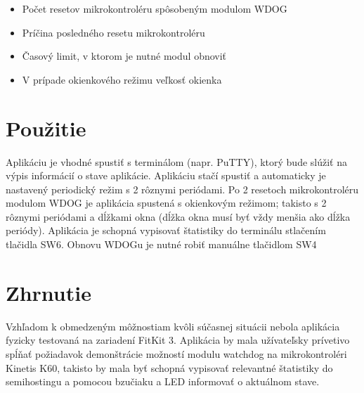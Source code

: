 \documentclass[12pt,a4paper,titlepage,final]{article}
\begin{document}
\begin{itemize}
    \item Počet resetov mikrokontroléru spôsobeným modulom WDOG
    \item Príčina posledného resetu mikrokontroléru
    \item Časový limit, v ktorom je nutné modul obnoviť
    \item V prípade okienkového režimu veľkosť okienka
\end{itemize}


\section{Použitie}
Aplikáciu je vhodné spustiť s terminálom (napr. PuTTY), ktorý bude slúžiť na výpis informácií o stave aplikácie. Aplikáciu stačí spustiť a automaticky je nastavený periodický režim s 2 rôznymi periódami. Po 2 resetoch mikrokontroléru modulom WDOG je aplikácia spustená s okienkovým režimom; takisto s 2 rôznymi periódami a dĺžkami okna (dĺžka okna musí byť vždy menšia ako dĺžka periódy). Aplikácia je schopná vypisovať štatistiky do terminálu stlačením tlačidla SW6. Obnovu WDOGu je nutné robiť manuálne tlačidlom SW4


\section{Zhrnutie}
Vzhľadom k obmedzeným môžnostiam kvôli súčasnej situácii nebola aplikácia fyzicky testovaná na zariadení FitKit 3. Aplikácia by mala užívateľsky prívetivo spĺňať požiadavok demonštrácie možností modulu watchdog na mikrokontroléri Kinetis K60, takisto by mala byť schopná vypisovať relevantné štatistiky do semihostingu a pomocou bzučiaku a LED informovať o aktuálnom stave.


\newpage

\nocite{*}



\end{document}

